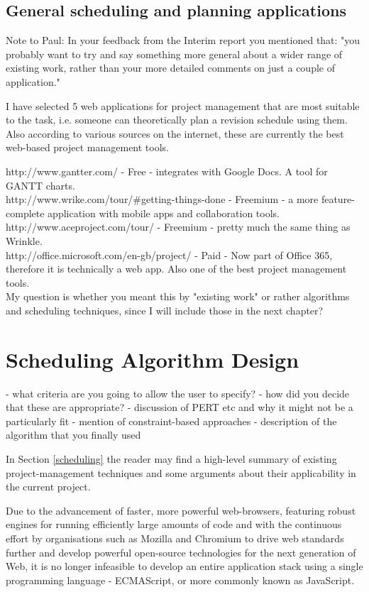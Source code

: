 \documentclass[bsc,frontabs,twoside,singlespacing,parskip]{infthesis}     %
\begin{document}
	\section{General scheduling and planning applications}
		Note to Paul:
		In your feedback from the Interim report you mentioned that:
		"you probably want to try and say something more general about a wider range of existing work, rather than your more detailed comments on just a couple of application."

		I have selected 5 web applications for project management that are most suitable to the task, i.e. someone can theoretically plan a revision schedule using them. Also according to various sources on the internet, these are currently the best web-based project management tools.

		http://www.gantter.com/ - Free - integrates with Google Docs. A tool for GANTT charts.\\
		http://www.wrike.com/tour/\#getting-things-done - Freemium - a more feature-complete application with mobile apps and collaboration tools.\\
		http://www.aceproject.com/tour/ - Freemium - pretty much the same thing as Wrinkle.\\
		http://office.microsoft.com/en-gb/project/ - Paid - Now part of Office 365, therefore it is technically a web app. Also one of the best project management tools.\\

		My question is whether you meant this by "existing work" or rather algorithms and scheduling techniques, since I will include those in the next chapter?


\chapter{Scheduling Algorithm Design}\label{algo_design}

	- what criteria are you going to allow the user to specify?
	- how did you decide that these are appropriate?
	- discussion of PERT etc and why it might not be a particularly fit
	- mention of constraint-based approaches
	- description of the algorithm that you finally used

	In Section \ref{scheduling} the reader may find a high-level summary of existing project-management techniques and some arguments about their applicability in the current project.

	Due to the advancement of faster, more powerful web-browsers, featuring robust engines for running efficiently large amounts of  code and with the continuous effort by organisations such as Mozilla and Chromium to drive web standards further and develop powerful open-source technologies for the next generation of Web, it is no longer infeasible to develop an entire application stack using a single programming language - ECMAScript, or more commonly known as JavaScript.
\end{document}
